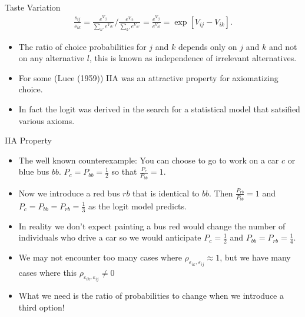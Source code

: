 \documentclass[xcolor=pdftex,dvipsnames,table,mathserif]{beamer}
\begin{document}
\begin{frame}{Taste Variation}
\begin{eqnarray*}
\frac{s_{ij}}{s_{ik}} = \frac{e^{V_{ij}}}{\sum_{k'} e^{V_{ik'}}} / \frac{e^{V_{ik}}}{\sum_{k'} e^{V_{ik'}}} = \frac{e^{V_{ij}}}{e^{V_{ik}}} = \exp[V_{ij} - V_{ik}].
\end{eqnarray*}
\begin{itemize}
\item The ratio of choice probabilities for $j$ and $k$ depends only on $j$ and $k$ and not on any alternative $l$, this is known as \alert{independence of irrelevant alternatives}.
\item For some (Luce (1959)) IIA was an attractive property for axiomatizing choice.
\item In fact the logit was derived in the search for a statistical model that satsified various axioms.
\end{itemize}
\end{frame}

\begin{frame}{IIA Property}
\begin{itemize}
\item The well known counterexample: You can choose to go to work on a car $c$ or blue bus $bb$. $P_{c} = P_{bb} = \frac{1}{2}$ so that $\frac{P_c}{P_{bb}} = 1$.
\item Now we introduce a red bus $rb$ that is identical to $bb$. Then $\frac{P_{rb}}{P_{bb}} = 1$ and $P_{c} = P_{bb}= P_{rb} = \frac{1}{3}$ as the logit model predicts.
\item In reality we don't expect painting a bus red would change the number of individuals who drive a car so we would anticipate $P_{c} = \frac{1}{2}$ and $P_{bb} = P_{rb} = \frac{1}{4}$.
\item We may not encounter too many cases where $\rho_{\varepsilon_{ik},\varepsilon_{ij}} \approx 1$, but we have many cases where this $\rho_{\varepsilon_{ik},\varepsilon_{ij}} \neq 0$
\item What we need is the ratio of probabilities to change when we introduce a third option!
\end{itemize}
\end{frame}
\end{document}
